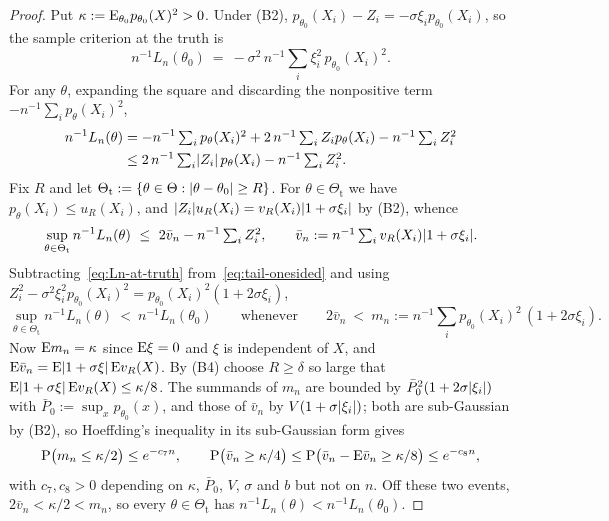 \begin{proof}
Put $\kappa:=\mathrm{E}_{\theta_0}p_{\theta_0}(X)^2>0$. Under (B2), $p_{\theta_0}(X_i)-Z_i=-\sigma\xi_ip_{\theta_0}(X_i)$, so the sample criterion at the truth is
\begin{equation}\label{eq:Ln-at-truth}
	n^{-1}L_n(\theta_0)\ =\ -\sigma^2\,n^{-1}\textstyle\sum_i\xi_i^2\,p_{\theta_0}(X_i)^2 .
\end{equation}
For any $\theta$, expanding the square and discarding the nonpositive term $-n^{-1}\sum_ip_\theta(X_i)^2$,
$$
\begin{aligned}
n^{-1}L_n(\theta)&=-n^{-1}\textstyle\sum_ip_\theta(X_i)^2+2\,n^{-1}\sum_iZ_ip_\theta(X_i)-n^{-1}\sum_iZ_i^2\\
&\leq2\,n^{-1}\textstyle\sum_i\lvert Z_i\rvert\,p_\theta(X_i)-n^{-1}\sum_iZ_i^2.
\end{aligned}
$$
Fix $R$ and let $\Theta_{\mathrm{t}}:=\{\theta\in\Theta:\lvert\theta-\theta_0\rvert\ge R\}$. For $\theta\in\Theta_{\mathrm{t}}$ we have $p_\theta(X_i)\le u_R(X_i)$, and $\lvert Z_i\rvert u_R(X_i)=v_R(X_i)\lvert1+\sigma\xi_i\rvert$ by (B2), whence
\begin{equation}\label{eq:tail-onesided}
	\sup_{\theta\in\Theta_{\mathrm{t}}}n^{-1}L_n(\theta)\ \le\ 2\bar v_n-n^{-1}\textstyle\sum_iZ_i^2,\qquad \bar v_n:=n^{-1}\textstyle\sum_iv_R(X_i)\lvert1+\sigma\xi_i\rvert.
\end{equation}
Subtracting~\eqref{eq:Ln-at-truth} from~\eqref{eq:tail-onesided} and using $Z_i^2-\sigma^2\xi_i^2p_{\theta_0}(X_i)^2=p_{\theta_0}(X_i)^2(1+2\sigma\xi_i)$,
$$
\sup_{\theta\in\Theta_{\mathrm{t}}}n^{-1}L_n(\theta)\ <\ n^{-1}L_n(\theta_0)
\qquad\text{whenever}\qquad
2\bar v_n\ <\ m_n:=n^{-1}\textstyle\sum_ip_{\theta_0}(X_i)^2\,(1+2\sigma\xi_i).
$$
Now $\mathrm{E} m_n=\kappa$ since $\mathrm{E}\xi=0$ and $\xi$ is independent of $X$, and $\mathrm{E}\bar v_n=\mathrm{E}\lvert1+\sigma\xi\rvert\,\mathrm{E} v_R(X)$. By (B4) choose $R\ge\delta$ so large that $\mathrm{E}\lvert1+\sigma\xi\rvert\,\mathrm{E} v_R(X)\le\kappa/8$. The summands of $m_n$ are bounded by $\bar P_{0}^2(1+2\sigma\lvert\xi_i\rvert)$ with $\bar P_0:=\sup_xp_{\theta_0}(x)$, and those of $\bar v_n$ by $V(1+\sigma\lvert\xi_i\rvert)$; both are sub-Gaussian by (B2), so Hoeffding's inequality in its sub-Gaussian form \cite{Vershynin2018} gives
$$
\mathrm{P}\big(m_n\le\kappa/2\big)\le e^{-c_7n},\qquad \mathrm{P}\big(\bar v_n\ge\kappa/4\big)\le\mathrm{P}\big(\bar v_n-\mathrm{E}\bar v_n\ge\kappa/8\big)\le e^{-c_8n},
$$
with $c_7,c_8>0$ depending on $\kappa$, $\bar P_0$, $V$, $\sigma$ and $b$ but not on $n$. Off these two events, $2\bar v_n<\kappa/2<m_n$, so every $\theta\in\Theta_{\mathrm{t}}$ has $n^{-1}L_n(\theta)<n^{-1}L_n(\theta_0)$.


\end{proof}
